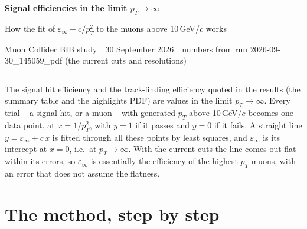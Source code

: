 \documentclass[11pt,letterpaper]{article}
\newcommand{\pT}{p_T}
\newcommand{\einf}{\varepsilon_\infty}
\begin{document}
{\LARGE\bfseries Signal efficiencies in the limit $\pT\to\infty$\par}
\vspace{4pt}
{\large How the fit of $\einf + c/\pT^2$ to the muons above 10\,GeV/$c$ works\par}
\vspace{6pt}
{\small\color{muted}Muon Collider BIB study \,\textperiodcentered\, 30 September 2026 \,\textperiodcentered\, numbers from run 2026-09-30\_145059\_pdf (the current cuts and resolutions)\par}
\vspace{2pt}
{\color{muted}\rule{\linewidth}{0.4pt}}

\begin{tcolorbox}[colback=boxbg,colframe=boxbg,arc=2pt,left=8pt,right=8pt,top=6pt,bottom=6pt,boxsep=0pt]
The signal hit efficiency and the track-finding efficiency quoted in the results (the summary table and the
highlights PDF) are values in the limit $\pT\to\infty$. Every trial -- a signal hit, or a muon -- with generated
$\pT$ above 10\,GeV/$c$ becomes one data point, at $x = 1/\pT^2$, with $y = 1$ if it passes and $y = 0$ if it
fails. A straight line $y = \einf + c\,x$ is fitted through all these points by least squares, and $\einf$ is
its intercept at $x = 0$, i.e.\ at $\pT\to\infty$. With the current cuts the line comes out flat within its
errors, so $\einf$ is essentially the efficiency of the highest-$\pT$ muons, with an error that does not assume
the flatness.
\end{tcolorbox}

\section{The method, step by step}
\end{document}
